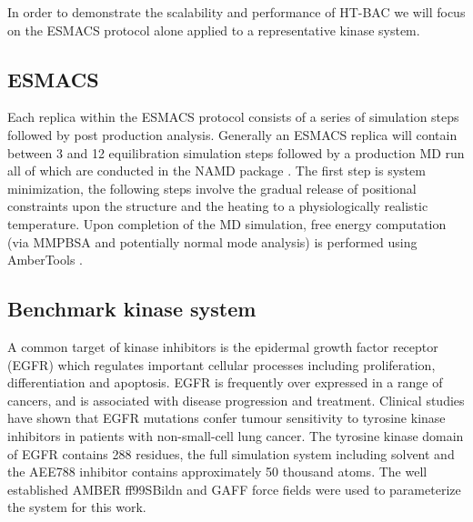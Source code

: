 In order to demonstrate the scalability and performance of HT-BAC we will focus on the ESMACS protocol alone applied to a representative kinase system.

\subsection{ESMACS}

Each replica within the ESMACS protocol consists of a series of simulation steps followed by post production analysis.
Generally an ESMACS replica will contain between 3 and 12 equilibration simulation steps followed by a production MD run all of which are conducted in the NAMD package \cite{Phillips2005}.
The first step is system minimization, the following steps involve the gradual release of positional constraints upon the structure and the heating to a physiologically realistic temperature.
Upon completion of the MD simulation, free energy computation (via MMPBSA and potentially normal mode analysis) is performed using AmberTools \cite{amber14, Case2005, MillerIII2012}.

\subsection{Benchmark kinase system}

A common target of kinase inhibitors is the epidermal growth factor receptor (EGFR) which regulates important cellular processes including proliferation, differentiation and apoptosis.
EGFR is frequently over expressed in a range of cancers, and is associated with disease progression and treatment. 
Clinical studies have shown that EGFR mutations confer tumour sensitivity to tyrosine kinase inhibitors in patients with non-small-cell lung cancer.
The tyrosine kinase domain of EGFR contains 288 residues, the full simulation system including solvent and the AEE788 inhibitor contains approximately 50 thousand atoms.
The well established AMBER ff99SBildn and GAFF force fields \cite{Maier2015, Wang2004} were used to parameterize the system for this work.
